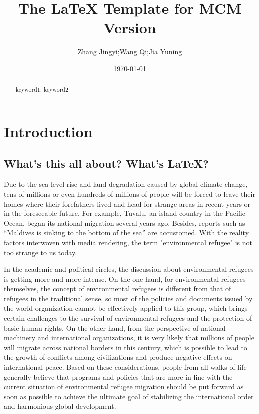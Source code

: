 \documentclass{mcmthesis}
\title{The \LaTeX{} Template for MCM Version \MCMversion}%
\author{Zhang Jingyi;Wang Qi;Jia Yuning}%
\date{\today}
\begin{document}
\begin{abstract}
\lipsum[1]%
\begin{keywords}
keyword1; keyword2
\end{keywords}
\end{abstract}
\maketitle
\section{Introduction}
\subsection{What's this all about? What's \LaTeX?}
Due to the sea level rise and land degradation caused by global climate change, tens of millions or even hundreds of millions of people will be forced to leave their homes where their forefathers lived and head for strange areas in recent years or in the foreseeable future. For example, Tuvalu, an island country in the Pacific Ocean, began its national migration several years ago. Besides, reports such as “Maldives is sinking to the bottom of the sea” are accustomed. With the reality factors interwoven with media rendering, the term "environmental refugee" is not too strange to us today.


In the academic and political circles, the discussion about environmental refugees is getting more and more intense. On the one hand, for environmental refugees themselves, the concept of environmental refugees is different from that of refugees in the traditional sense, so most of the policies and documents issued by the world organization cannot be effectively applied to this group, which brings certain challenges to the survival of environmental refugees and the protection of basic human rights. On the other hand, from the perspective of national machinery and international organizations, it is very likely that millions of people will migrate across national borders in this century, which is possible to lead to the growth of conflicts among civilizations and produce negative effects on international peace. Based on these considerations, people from all walks of life generally believe that programs and policies that are more in line with the current situation of environmental refugee migration should be put forward as soon as possible to achieve the ultimate goal of stabilizing the international order and harmonious global development.
\end{document}
